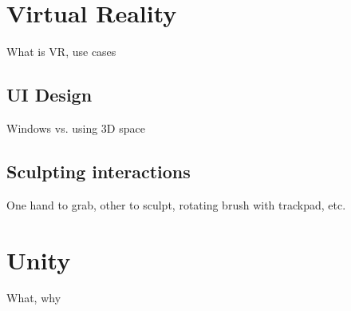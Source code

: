 \section{Virtual Reality}
What is VR, use cases

\subsection{UI Design}
Windows vs. using 3D space

\subsection{Sculpting interactions}
One hand to grab, other to sculpt, rotating brush with trackpad, etc.

\section{Unity}
What, why